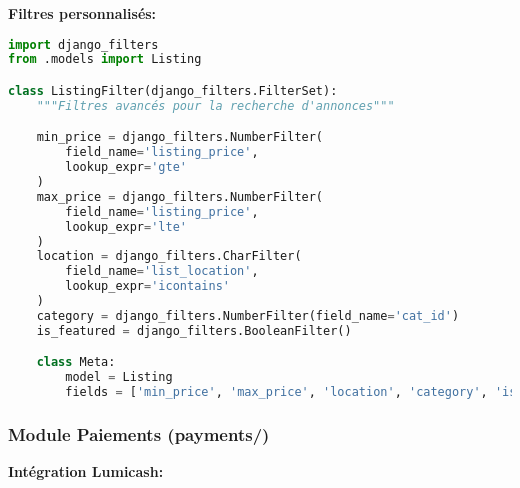 \textbf{Filtres personnalisés:}

\begin{lstlisting}[language=Python, caption=listings/filters.py]
import django_filters
from .models import Listing

class ListingFilter(django_filters.FilterSet):
    """Filtres avancés pour la recherche d'annonces"""

    min_price = django_filters.NumberFilter(
        field_name='listing_price',
        lookup_expr='gte'
    )
    max_price = django_filters.NumberFilter(
        field_name='listing_price',
        lookup_expr='lte'
    )
    location = django_filters.CharFilter(
        field_name='list_location',
        lookup_expr='icontains'
    )
    category = django_filters.NumberFilter(field_name='cat_id')
    is_featured = django_filters.BooleanFilter()

    class Meta:
        model = Listing
        fields = ['min_price', 'max_price', 'location', 'category', 'is_featured']
\end{lstlisting}

\subsubsection{Module Paiements (payments/)}

\textbf{Intégration Lumicash:}

